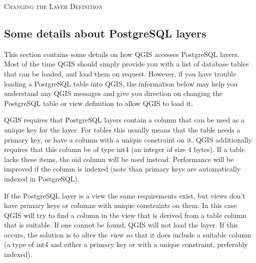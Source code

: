 \begin{Tip}\caption{\textsc{Changing the Layer Definition}}
\end{Tip}

\subsection{Some details about PostgreSQL layers}\label{sec:postgis_details}
This section contains some details on how QGIS accesses PostgreSQL
layers. Most of the time QGIS should simply provide you with a list of
database tables that can be loaded, and load them on request. However,
if you have trouble 
loading a PostgreSQL table into QGIS, the information below may help
you understand any QGIS messages and give you direction on changing
the PostgreSQL table or view definition to allow QGIS to load it.

QGIS requires that PostgreSQL layers contain a column that can be
used as a unique key for the layer. For tables this usually means
that the table needs a primary key, or have a column with a unique
constraint on it. QGIS additionally requires that this column be of
type int4 (an integer of size 4 bytes). If a table lacks these items,
the oid column will 
be used instead. Performance will be improved if the column is
indexed (note than primary keys are automatically indexed in PostgreSQL). 

If the PostgreSQL layer is a view the same requirements exist, but
views don't have primary keys or columns with unique constraints on
them. In this case QGIS will try to find a column in the view that is
derived from a table column that is suitable. If one cannot be found,
QGIS will not load the layer. If this occurs, the solution is to alter
the view so that it does include a suitable column (a type of int4
and either a primary key or with a unique constraint, preferably indexed).

